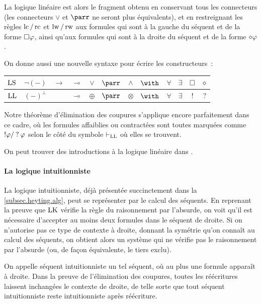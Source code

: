 La logique linéaire est alors le fragment obtenu en conservant tous les
connecteurs (les connecteurs $\lor$ et $\parr$ ne seront plus équivalents), et
en restreignant les règles $\operatorname{lc}/\operatorname{rc}$ et $\operatorname{lw}/\operatorname{rw}$ aux formules qui sont à la
gauche du séquent et de la forme $\mathbin{\square}\varphi$, ainsi qu'aux formules qui sont
à la droite du séquent et de la forme $\mathbin{\diamond}\varphi$.

On donne aussi une nouvelle syntaxe pour écrire les constructeurs~:
\begin{center}
  \begin{tabular}{|c|c|c|c|c|c|c|c|c|c|c|c|}
    \hline
    $\operatorname{LS}$ & $\lnot(-)$&$\to$&$\multimap$&$\lor$&$\parr$&$\land$&$\with$&
    $\forall$&$\exists$&$\mathbin{\square}$&$\mathbin{\diamond}$ \\
    \hline
    $\operatorname{LL}$ & $(-)^\bot$& & $\multimap$&$\oplus$&$\parr$&$\otimes$&$\with$&
    $\forall$&$\exists$&$!$&$?$ \\
    \hline
  \end{tabular}
\end{center}
Notre théorème d'élimination des coupures s'applique encore parfaitement dans ce
cadre, où les formules affaiblies ou contractées sont toutes marquées comme
$\mathbin{!}\varphi/\mathbin{?}\varphi$ selon le côté du symbole $\vdash_{\operatorname{LL}}$ où elles
se trouvent.

On peut trouver des introductions à la logique linéaire dans
\cite{Girard2006,GirardLafontTaylor1989,Girard1987,Girard1995}.

\paragraph{La logique intuitionniste}
La logique intuitionniste, déjà présentée succinctement dans la
\cref{subsec.heyting.alg}, peut se représenter par le calcul des séquents. En
reprenant la preuve que $\operatorname{LK}$ vérifie la règle du raisonnement par l'absurde, on
voit qu'il est nécessaire d'accepter au moins deux formules dans le séquent de
droite. Si on n'autorise pas ce type de contexte à droite, donnant la symétrie
qu'on connaît au calcul des séquents, on obtient alors un système qui ne
vérifie pas le raisonnement par l'absurde (ou, de façon équivalente, le tiers
exclu).

On appelle séquent intuitionniste un tel séquent, où au plus une formule
apparaît à droite.
Dans la preuve de l'élimination des coupures, toutes les réécritures
laissent inchangées le contexte de droite, de telle sorte que tout séquent
intuitionniste reste intuitionniste après réécriture.

